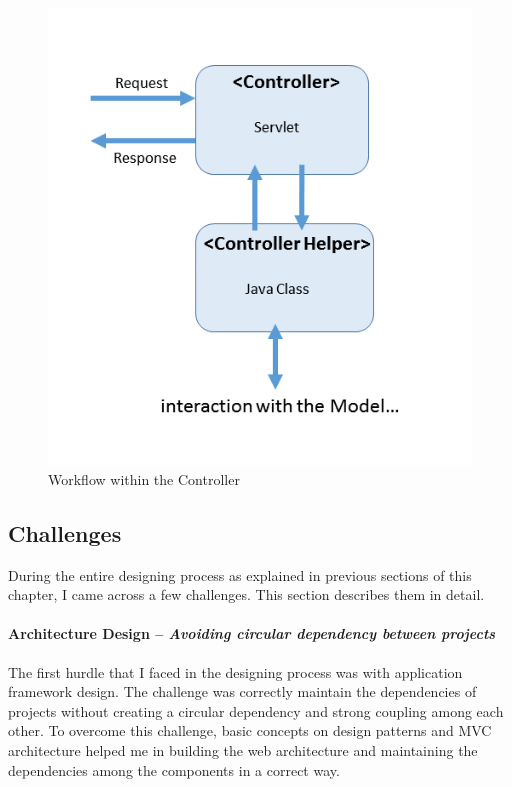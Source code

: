 \begin{figure}
	\includegraphics[width=1\textwidth]{figures/Controller_Workflow}
	\caption{Workflow within the Controller}
	\label{fig:Controller_Workflow}
\end{figure}

\subsection{Challenges}\label{subsec:designchallenges}
During the entire designing process as explained in previous sections of this chapter, I came across a few challenges. This section describes them in detail.

\paragraph{Architecture Design -- \textit{Avoiding circular dependency between projects}}
The first hurdle that I faced in the designing process was with application framework design. The challenge was correctly maintain the dependencies of projects without creating a circular dependency and strong coupling among each other. To overcome this challenge, basic concepts on design patterns and MVC architecture helped me in building the web architecture and maintaining the dependencies among the components in a correct way. 

